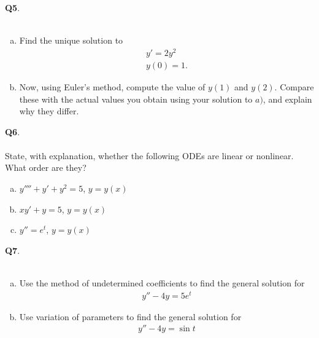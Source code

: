 \documentclass[12pt, oneside]{amsart}
\begin{document}
\noindent
\textbf{Q5}. \\ \\ 
\begin{enumerate}[a)]
	\item
Find the unique solution to
\begin{align*}
y' = 2y^2 \\
y(0)=1.
\end{align*}
\vspace{3in}
\item
Now, using Euler's method, compute the value
of $y(1)$ and $y(2)$. Compare these
with the actual values you obtain using your
solution to $a)$, and explain why they differ.
\end{enumerate}
\newpage
\noindent
\textbf{Q6}. \\ \\ 
State, with explanation, whether the following ODEs are linear or nonlinear. What order are they?

\vspace{1in}
\begin{enumerate}[a)]
    \item
        $y'''' + y' + y^{2} = 5$, \quad $y = y(x)$
        \vspace{2in}

    \item
        $xy' + y = 5$, \quad $y = y(x)$
        \vspace{2in}

    \item 
        $y'' = e^t$, \quad $y = y(x)$
        \vspace{2in}
\end{enumerate}
\newpage
\textbf{Q7}. \\ \\ 
\begin{enumerate}[a)]
	\item
Use the method of undetermined coefficients to find the
general solution for
\begin{align*}
y'' -4y = 5e^t
\end{align*}
\vspace{3in}
\item

Use variation of parameters to find the general solution for
\begin{align*}
y'' - 4y = \sin t
\end{align*}
\end{enumerate}
\end{document}
